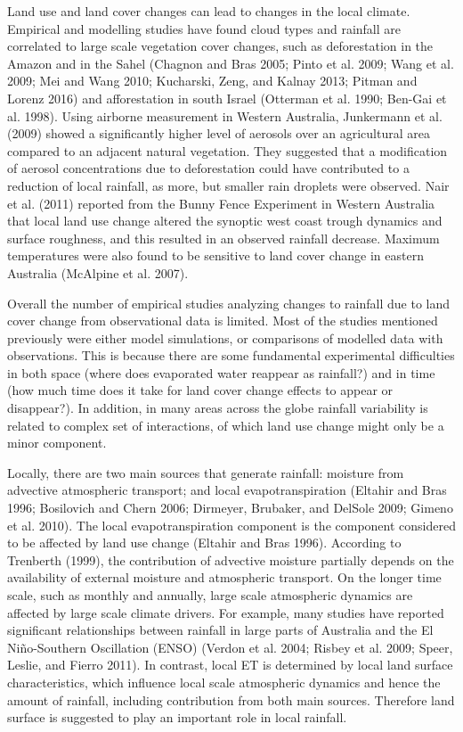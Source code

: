 \documentclass[]{elsarticle} %
\theoremstyle{definition}
\theoremstyle{definition}
\theoremstyle{definition}
\theoremstyle{remark}
\begin{document}
Land use and land cover changes can lead to changes in the local
climate. Empirical and modelling studies have found cloud types and
rainfall are correlated to large scale vegetation cover changes, such as
deforestation in the Amazon and in the Sahel (Chagnon and Bras 2005;
Pinto et al. 2009; Wang et al. 2009; Mei and Wang 2010; Kucharski, Zeng,
and Kalnay 2013; Pitman and Lorenz 2016) and afforestation in south
Israel (Otterman et al. 1990; Ben-Gai et al. 1998). Using airborne
measurement in Western Australia, Junkermann et al. (2009) showed a
significantly higher level of aerosols over an agricultural area
compared to an adjacent natural vegetation. They suggested that a
modification of aerosol concentrations due to deforestation could have
contributed to a reduction of local rainfall, as more, but smaller rain
droplets were observed. Nair et al. (2011) reported from the Bunny Fence
Experiment in Western Australia that local land use change altered the
synoptic west coast trough dynamics and surface roughness, and this
resulted in an observed rainfall decrease. Maximum temperatures were
also found to be sensitive to land cover change in eastern Australia
(McAlpine et al. 2007).

Overall the number of empirical studies analyzing changes to rainfall
due to land cover change from observational data is limited. Most of the
studies mentioned previously were either model simulations, or
comparisons of modelled data with observations. This is because there
are some fundamental experimental difficulties in both space (where does
evaporated water reappear as rainfall?) and in time (how much time does
it take for land cover change effects to appear or disappear?). In
addition, in many areas across the globe rainfall variability is related
to complex set of interactions, of which land use change might only be a
minor component.

Locally, there are two main sources that generate rainfall: moisture
from advective atmospheric transport; and local evapotranspiration
(Eltahir and Bras 1996; Bosilovich and Chern 2006; Dirmeyer, Brubaker,
and DelSole 2009; Gimeno et al. 2010). The local evapotranspiration
component is the component considered to be affected by land use change
(Eltahir and Bras 1996). According to Trenberth (1999), the contribution
of advective moisture partially depends on the availability of external
moisture and atmospheric transport. On the longer time scale, such as
monthly and annually, large scale atmospheric dynamics are affected by
large scale climate drivers. For example, many studies have reported
significant relationships between rainfall in large parts of Australia
and the El Niño-Southern Oscillation (ENSO) (Verdon et al. 2004; Risbey
et al. 2009; Speer, Leslie, and Fierro 2011). In contrast, local ET is
determined by local land surface characteristics, which influence local
scale atmospheric dynamics and hence the amount of rainfall, including
contribution from both main sources. Therefore land surface is suggested
to play an important role in local rainfall.
\end{document}
